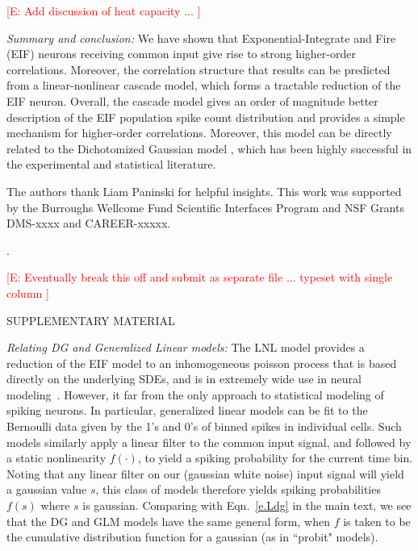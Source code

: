 \documentclass[%
 reprint,
 twocolumn,
 amsmath,amssymb,
 aps,
floatfix,
]{revtex4}
\newcommand{\Ecomment}[1]{\textcolor{red}{[E: #1]}}
\begin{document}
\Ecomment{Add discussion of heat capacity ... }

\bigskip 
{\it Summary and conclusion:}   %
We have shown that Exponential-Integrate and Fire (EIF) neurons receiving common input give rise to strong higher-order correlations.  Moreover, the correlation structure that results can be predicted from a linear-nonlinear cascade model, which forms  a tractable reduction of the EIF neuron.  Overall, the cascade model gives an order of magnitude better description of the EIF population spike count distribution and provides a simple mechanism for higher-order correlations.  Moreover, this model can be directly related to the Dichotomized Gaussian model , which has been highly successful in the experimental and statistical literature.

\bigskip 

\bigskip



The authors thank Liam Paninski for helpful insights. This work was supported by the Burroughs Wellcome Fund Scientific Interfaces Program and NSF Grants DMS-xxxx and CAREER-xxxxx.  



\newpage
.
\newpage

\Ecomment{Eventually break this off and submit as separate file ... typeset with single column }


\bigskip

SUPPLEMENTARY MATERIAL 

\bigskip


{\it Relating DG and Generalized Linear models:}
The LNL model provides a reduction of the EIF model to an inhomogeneous poisson process that is based directly on the underlying SDEs, and is in extremely wide use in neural modeling~\cite{Abb-Dayan}.  However, it far from the only approach to statistical modeling of spiking neurons.  In particular, generalized linear models can be fit to the Bernoulli data given by the 1's and 0's of binned spikes in individual cells.  Such models similarly apply a linear filter to the common input signal, and followed by a static nonlinearity $f(\cdot)$, to yield a spiking probability for the current time bin.  Noting that any linear filter on our (gaussian white noise) input signal will yield a gaussian value $s$, this class of models therefore yields spiking probabilities $f(s)$ where $s$ is gaussian.  Comparing with Eqn.~\eqref{e.Ldg} in the main text, we see that the DG and GLM models have the same general form, when $f$ is taken to be the cumulative distribution function for a gaussian (as in ``probit" models). 
\end{document}
